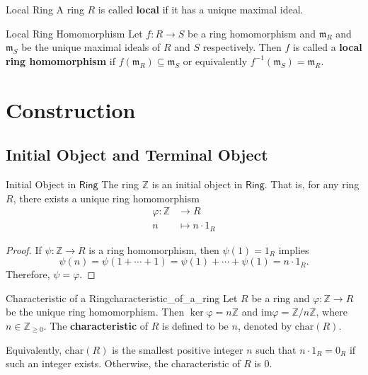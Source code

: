\begin{definition}{Local Ring}{}
    A ring $R$ is called \textbf{local} if it has a unique maximal ideal.
\end{definition}

\begin{definition}{Local Ring Homomorphism}{}
    Let $f:R\to S$ be a ring homomorphism and $\mathfrak{m}_R$ and $\mathfrak{m}_S$ be the unique maximal ideals of $R$ and $S$ respectively. Then $f$ is called a \textbf{local ring homomorphism} if $f(\mathfrak{m}_R)\subseteq \mathfrak{m}_S$ or equivalently $f^{-1}(\mathfrak{m}_S)=\mathfrak{m}_R$.
\end{definition}

\section{Construction}
\subsection{Initial Object and Terminal Object}
\begin{proposition}{Initial Object in $\mathsf{Ring}$}{}
    The ring $\mathbb{Z}$ is an initial object in $\mathsf{Ring}$. That is, for any ring $R$, there exists a unique ring homomorphism
    \begin{align*}
        \varphi:\mathbb{Z}&\longrightarrow R\\
        n&\longmapsto n\cdot 1_R
    \end{align*}
\end{proposition}
\begin{proof}
    If $\psi: \mathbb{Z} \to R$ is a ring homomorphism, then $\psi(1) = 1_R$ implies 
    \[
        \psi(n) = \psi(1+\cdots+ 1) = \psi(1)+\cdots+ \psi(1) = n \cdot 1_R.
    \]
    Therefore, $\psi = \varphi$.
\end{proof}

\begin{definition}{Characteristic of a Ring}{characteristic_of_a_ring}
    Let $R$ be a ring and $\varphi:\mathbb{Z}\to R$ be the unique ring homomorphism. Then $\ker\mathrm{\varphi}= n\mathbb{Z}$ and $\mathrm{im}\varphi=\mathbb{Z}/n\mathbb{Z}$, where $n\in\mathbb{Z}_{\ge 0}$.
    The \textbf{characteristic} of $R$ is defined to be $n$, denoted by $\mathrm{char}(R)$.

    Equivalently, $\mathrm{char}(R)$ is the smallest positive integer $n$ such that $n\cdot 1_R=0_R$ if such an integer exists. Otherwise, the characteristic of $R$ is $0$.
\end{definition}


